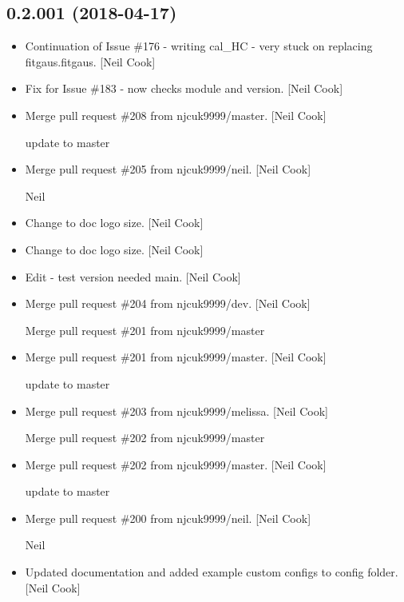 \documentclass[a4paper,10pt,english]{report}
\begin{document}
\subsection{0.2.001 (2018-04-17)}
\label{\detokenize{misc/changelog:id458}}\begin{itemize}
\item {} 
Continuation of Issue \#176 - writing cal\_HC - very stuck on replacing
fitgaus.fitgaus. {[}Neil Cook{]}

\item {} 
Fix for Issue \#183 - now checks module and version. {[}Neil Cook{]}

\item {} 
Merge pull request \#208 from njcuk9999/master. {[}Neil Cook{]}

update to master

\item {} 
Merge pull request \#205 from njcuk9999/neil. {[}Neil Cook{]}

Neil

\item {} 
Change to doc logo size. {[}Neil Cook{]}

\item {} 
Change to doc logo size. {[}Neil Cook{]}

\item {} 
Edit - test version needed main. {[}Neil Cook{]}

\item {} 
Merge pull request \#204 from njcuk9999/dev. {[}Neil Cook{]}

Merge pull request \#201 from njcuk9999/master

\item {} 
Merge pull request \#201 from njcuk9999/master. {[}Neil Cook{]}

update to master

\item {} 
Merge pull request \#203 from njcuk9999/melissa. {[}Neil Cook{]}

Merge pull request \#202 from njcuk9999/master

\item {} 
Merge pull request \#202 from njcuk9999/master. {[}Neil Cook{]}

update to master

\item {} 
Merge pull request \#200 from njcuk9999/neil. {[}Neil Cook{]}

Neil

\item {} 
Updated documentation and added example custom configs to config
folder. {[}Neil Cook{]}


\end{itemize}
\end{document}
